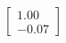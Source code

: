 \documentclass[preview]{standalone}
\begin{document}
\begin{align*}
\begin{bmatrix} 1.00 \\ -0.07 \end{bmatrix}
\end{align*}
\end{document}
